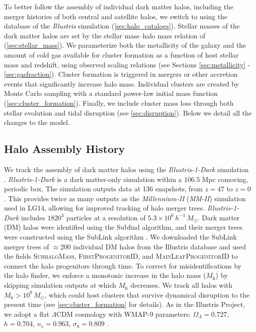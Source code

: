 \documentclass[fleqn,usenatbib]{mnras}
\newcommand{\Mh}{M_{\mathrm{h}}}
\newcommand{\Msun}{\,M_{\odot}}
\newcommand{\Msunh}{\,h^{-1}\,M_{\odot}}
\begin{document}
To better follow the assembly of individual dark matter halos, including the merger histories of both central and satellite halos, we switch to using the database of the \textit{Illustris} simulation (\autoref{sec:halo_catalogs}). Stellar masses of the dark matter halos are set by the stellar mass--halo mass relation of \citet{behroozi_etal_2013_main} (\autoref{sec:stellar_mass}). We parameterize both the metallicity of the galaxy and the amount of cold gas available for cluster formation as a function of host stellar mass and redshift, using observed scaling relations (see Sections \ref{sec:metallicity} - \ref{sec:gasfraction}). Cluster formation is triggered in mergers or other accretion events that significantly increase halo mass. Individual clusters are created by Monte Carlo sampling with a standard power-law initial mass function (\autoref{sec:cluster_formation}). Finally, we include cluster mass loss through both stellar evolution and tidal disruption (see \autoref{sec:disruption}). Below we detail all the changes to the model. 

\subsection{Halo Assembly History}
\label{sec:halo_catalogs}

We track the assembly of dark matter halos using the \textit{Illustris-1-Dark} simulation \citep{vogelsberger_etal_2014, nelson_etal_2015}. \textit{Illustris-1-Dark} is a dark matter-only simulation within a $106.5$ Mpc comoving, periodic box. The simulation outputs data at 136 snapshots, from $z=47$ to $z=0$. This provides twice as many outputs as the \textit{Millennium-II} (\textit{MM-II}) simulation used in LG14, allowing for improved tracking of halo merger trees. \textit{Illustris-1-Dark} includes $1820^{3}$ particles at a resolution of $5.3\times 10^{6}\Msunh$. Dark matter (DM) halos were identified using the Subfind algorithm, and their merger trees were constructed using the SubLink algorithm \citep{springel_etal_2001, rodriguez-gomez_etal_2015}. We downloaded the SubLink merger trees of $\approx$200 individual DM halos from the Illustris database and used the fields \textsc{SubhaloMass}, \textsc{FirstProgenitorID}, and \textsc{MainLeafProgenitorID} to connect the halo progenitors through time. To correct for misidentifications by the halo finder, we enforce a monotonic increase in the halo mass ($\Mh$) by skipping simulation outputs at which $\Mh$ decreases. We track all halos with $\Mh > 10^{9}\Msun$, which could host clusters that survive dynamical disruption to the present time (see \autoref{sec:cluster_formation} for details). As in the Illustris Project, we adopt a flat $\Lambda$CDM cosmology with WMAP-9 parameters: $\Omega_{\Lambda} = 0.727$, $h = 0.704$, $n_{s} = 0.963$, $\sigma_{8} = 0.809$ \citep{hinshaw_etal_2013}.
\end{document}

